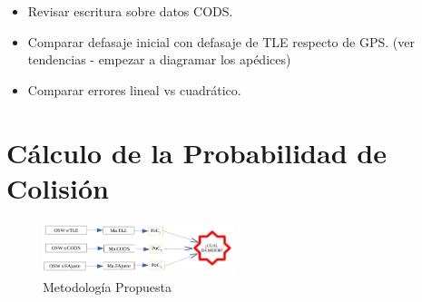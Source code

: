\begin{itemize}
 \item Revisar escritura sobre datos CODS.
 \item Comparar defasaje inicial con defasaje de TLE respecto de GPS. (ver tendencias - empezar a diagramar los apédices)
 \item Comparar errores lineal vs cuadr\'atico.
\end{itemize}

\section{C\'alculo de la Probabilidad de Colisi\'on}
\begin{figure}[!h]
\centering
 \includegraphics[width=0.5\textwidth]{imagenes/metodoARxCODE}
 \caption{Metodolog\'ia Propuesta}
 \label{fig:metodoARxCODE}
\end{figure}
